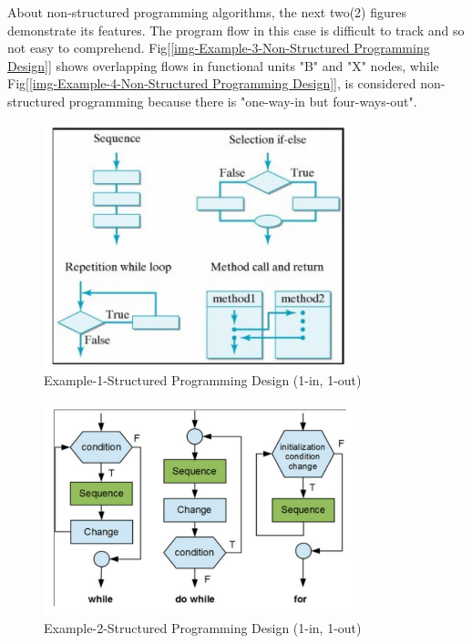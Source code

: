 About non-structured programming algorithms, the next two(2) figures demonstrate its features. The program flow in this case is difficult to track and so not easy to comprehend. Fig[\ref{img-Example-3-Non-Structured Programming Design}] shows overlapping flows in functional units "B" and "X" nodes, while Fig[\ref{img-Example-4-Non-Structured Programming Design}], is considered non-structured programming because there is "one-way-in but four-ways-out". \\	

\clearpage
\pagebreak

\begin{figure}
	\centering
	\caption  {Example-1-Structured Programming Design (1-in, 1-out)}
	\label{img-Example-1-Structured Programming Design}
	\includegraphics[width= 0.80\textwidth]{Chap3/AlgorithmTypes/Example-1-Structured-Programming-design.png} 
\end{figure}		


\begin{figure}
	\centering
	\caption  {Example-2-Structured Programming Design (1-in, 1-out)}
	\label{img-Example-2-Structured Programming Design}
	\includegraphics[width= 0.80\textwidth]{Chap3/AlgorithmTypes/Example-2-Structured-Programming-design.png} 
\end{figure}		

